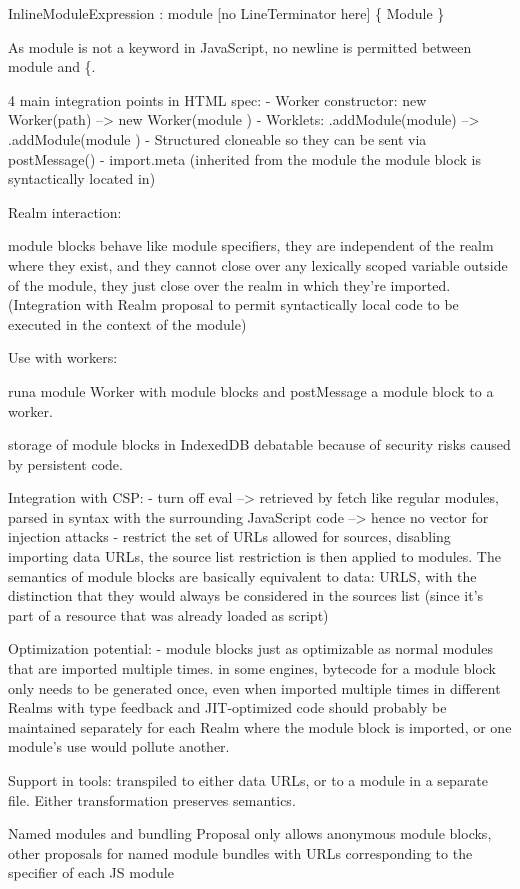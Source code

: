 InlineModuleExpression : module [no LineTerminator here] \{ Module \}

As module is not a keyword in JavaScript, no newline is permitted between module and \{.

4 main integration points in HTML spec:
	- Worker constructor: new Worker(path) --> new Worker(module {})
	- Worklets: .addModule(module) --> .addModule(module {})
	- Structured cloneable  so they can be sent via postMessage()
	- import.meta (inherited from the module the module block is syntactically located in)
	
Realm interaction:

module blocks behave like module specifiers, they are independent of the realm where they exist, and they cannot close over any lexically scoped variable outside of the module, they just close over the realm in which they're imported. (Integration with Realm proposal to permit syntactically local code to be executed in the context of the module)

Use with workers:

runa module Worker with module blocks and postMessage a module block to a worker.

storage of module blocks in IndexedDB debatable because of security risks caused by persistent code.

Integration with CSP:
	-	turn off eval --> retrieved by fetch like regular modules, parsed in syntax with the surrounding JavaScript code --> hence no vector for injection attacks
	- restrict the set of URLs allowed for sources, disabling importing data URLs, the source list restriction is then applied to modules. The semantics of module blocks are basically equivalent to data: URLS, with the distinction that they would always be considered in the sources list (since it's part of a resource that was already loaded as script)
	
Optimization potential:
	- module blocks just as optimizable as normal modules that are imported multiple times. in some engines, bytecode for a module block only needs to be generated once, even when imported multiple times in different Realms with type feedback and JIT-optimized code should probably be maintained separately for each Realm where the module block is imported, or one module's use would pollute another.
    
Support in tools:
    transpiled to either data URLs, or to a module in a separate file. Either transformation preserves semantics.
    
Named modules and bundling
    Proposal only allows anonymous module blocks, other proposals for named module bundles with URLs corresponding to the specifier of each JS module
    

